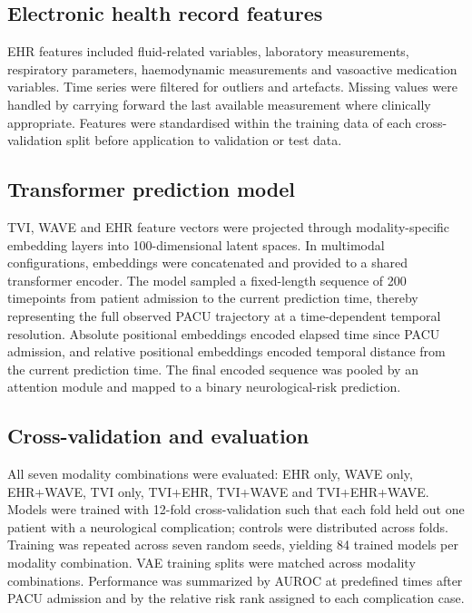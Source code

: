 \documentclass[pdflatex,sn-basic,Numbered]{sn-jnl}
\theoremstyle{thmstyleone}%
\theoremstyle{thmstyletwo}%
\theoremstyle{thmstylethree}%
\begin{document}
\subsection{Electronic health record features}

EHR features included fluid-related variables, laboratory measurements, respiratory parameters, haemodynamic measurements and vasoactive medication variables. Time series were filtered for outliers and artefacts. Missing values were handled by carrying forward the last available measurement where clinically appropriate. Features were standardised within the training data of each cross-validation split before application to validation or test data.

\subsection{Transformer prediction model}

TVI, WAVE and EHR feature vectors were projected through modality-specific embedding layers into 100-dimensional latent spaces. In multimodal configurations, embeddings were concatenated and provided to a shared transformer encoder. The model sampled a fixed-length sequence of 200 timepoints from patient admission to the current prediction time, thereby representing the full observed PACU trajectory at a time-dependent temporal resolution. Absolute positional embeddings encoded elapsed time since PACU admission, and relative positional embeddings encoded temporal distance from the current prediction time. The final encoded sequence was pooled by an attention module and mapped to a binary neurological-risk prediction.

\subsection{Cross-validation and evaluation}

All seven modality combinations were evaluated: EHR only, WAVE only, EHR+WAVE, TVI only, TVI+EHR, TVI+WAVE and TVI+EHR+WAVE. Models were trained with 12-fold cross-validation such that each fold held out one patient with a neurological complication; controls were distributed across folds. Training was repeated across seven random seeds, yielding 84 trained models per modality combination. VAE training splits were matched across modality combinations. Performance was summarized by AUROC at predefined times after PACU admission and by the relative risk rank assigned to each complication case.
\end{document}
